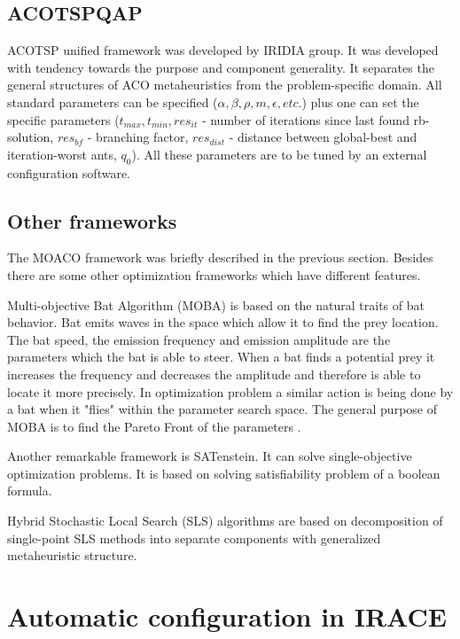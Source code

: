 \documentclass[12pt]{article}
\begin{document}
\subsection{ACOTSPQAP}

ACOTSP unified framework was developed by IRIDIA group. It was developed with tendency towards the purpose and component generality. It separates the general structures of ACO metaheuristics from the problem-specific domain. All standard parameters can be specified ($\alpha, \beta, \rho, m, \epsilon, etc.$) plus one can set the specific parameters ($t_{max}, t_{min}, res_{it}$ - number of iterations since last found rb-solution, $res_{bf}$ - branching factor, $res_{dist}$ - distance between global-best and iteration-worst ants, $q_0$). All these parameters are to be tuned by an external configuration software.

\subsection{Other frameworks}

The MOACO framework was briefly described in the previous section. Besides there are some other optimization frameworks which have different features.

Multi-objective Bat Algorithm (MOBA) is based on the natural traits of bat behavior. Bat emits waves in the space which allow it to find the prey location. The bat speed, the emission  frequency and emission amplitude are the parameters which the bat is able to steer. When a bat finds a potential prey it increases the frequency and decreases the amplitude and therefore is able to locate it more precisely. In optimization problem a similar action is being done by a bat when it "flies" within the parameter search space. The general purpose of MOBA is to find the Pareto Front of the parameters \cite{moba}.

Another remarkable framework is SATenstein. It can solve single-objective optimization problems. It is based on solving satisfiability problem of a boolean formula.

Hybrid Stochastic Local Search (SLS) algorithms are based on decomposition of single-point SLS methods into separate components with generalized metaheuristic structure.


\section{Automatic configuration in IRACE}
\end{document}
